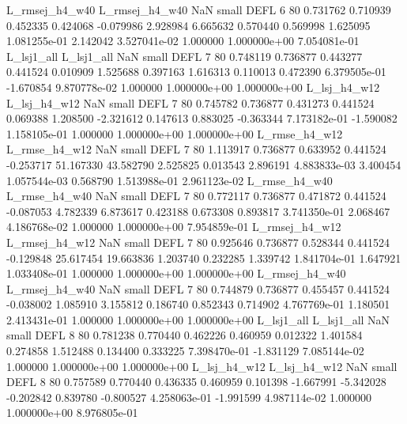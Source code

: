 L_rmsej_h4_w40 L_rmsej_h4_w40                   NaN      small     DEFL                 6 80 0.731762       0.710939 0.452335       0.424068   -0.079986      2.928984      6.665632     0.570440       0.569998  1.625095 1.081255e-01     2.142042   3.527041e-02            1.000000    1.000000e+00        7.054081e-01
    L_lsj1_all     L_lsj1_all                   NaN      small     DEFL                 7 80 0.748119       0.736877 0.443277       0.441524    0.010909      1.525688      0.397163     1.616313       0.110013  0.472390 6.379505e-01    -1.670854   9.870778e-02            1.000000    1.000000e+00        1.000000e+00
  L_lsj_h4_w12   L_lsj_h4_w12                   NaN      small     DEFL                 7 80 0.745782       0.736877 0.431273       0.441524    0.069388      1.208500     -2.321612     0.147613       0.883025 -0.363344 7.173182e-01    -1.590082   1.158105e-01            1.000000    1.000000e+00        1.000000e+00
 L_rmse_h4_w12  L_rmse_h4_w12                   NaN      small     DEFL                 7 80 1.113917       0.736877 0.633952       0.441524   -0.253717     51.167330     43.582790     2.525825       0.013543  2.896191 4.883833e-03     3.400454   1.057544e-03            0.568790    1.513988e-01        2.961123e-02
 L_rmse_h4_w40  L_rmse_h4_w40                   NaN      small     DEFL                 7 80 0.772117       0.736877 0.471872       0.441524   -0.087053      4.782339      6.873617     0.423188       0.673308  0.893817 3.741350e-01     2.068467   4.186768e-02            1.000000    1.000000e+00        7.954859e-01
L_rmsej_h4_w12 L_rmsej_h4_w12                   NaN      small     DEFL                 7 80 0.925646       0.736877 0.528344       0.441524   -0.129848     25.617454     19.663836     1.203740       0.232285  1.339742 1.841704e-01     1.647921   1.033408e-01            1.000000    1.000000e+00        1.000000e+00
L_rmsej_h4_w40 L_rmsej_h4_w40                   NaN      small     DEFL                 7 80 0.744879       0.736877 0.455457       0.441524   -0.038002      1.085910      3.155812     0.186740       0.852343  0.714902 4.767769e-01     1.180501   2.413431e-01            1.000000    1.000000e+00        1.000000e+00
    L_lsj1_all     L_lsj1_all                   NaN      small     DEFL                 8 80 0.781238       0.770440 0.462226       0.460959    0.012322      1.401584      0.274858     1.512488       0.134400  0.333225 7.398470e-01    -1.831129   7.085144e-02            1.000000    1.000000e+00        1.000000e+00
  L_lsj_h4_w12   L_lsj_h4_w12                   NaN      small     DEFL                 8 80 0.757589       0.770440 0.436335       0.460959    0.101398     -1.667991     -5.342028    -0.202842       0.839780 -0.800527 4.258063e-01    -1.991599   4.987114e-02            1.000000    1.000000e+00        8.976805e-01

